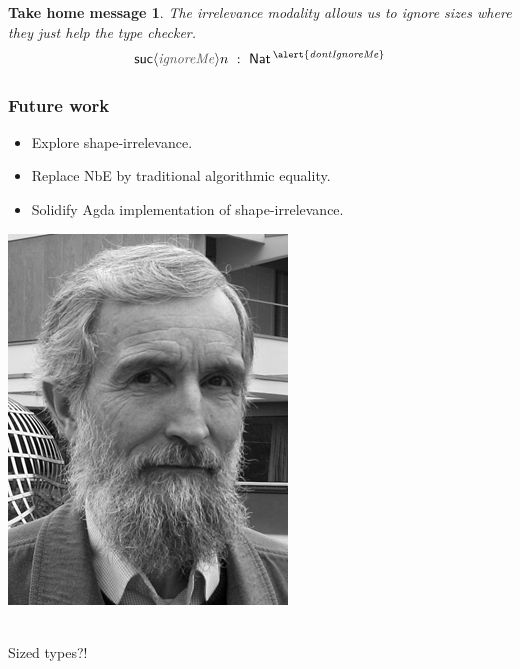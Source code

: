 \documentclass[t,fleqn]{beamer}
\newtheorem{takehomemessage}[theorem]{\textbf{Take home message}}
\newcommand{\cAnn}{\color{red!80!black}}%
\renewcommand{\emph}[1]{{\cAnn#1}}
\newcommand{\mlsays}[1]{
\begin{frame}%
  \begin{minipage}[c]{0.5\linewidth}
   \includegraphics[height=0.9\textheight]{martin-loef-bw.png}
  \end{minipage}%
  \begin{minipage}[c]{0.5\linewidth}
   \begin{center}
     \bla \\[8ex]
     \Huge #1
   \end{center}
  \end{minipage}
\end{frame}
}
\begin{document}
\begin{frame}%
\vfill
\hspace{0.15\textwidth}%
\begin{minipage}[c]{0.67\linewidth}
\begin{takehomemessage}
The irrelevance modality allows us to ignore sizes where they just help the type checker.
\[
  \suc {{\color{grey}\mathit{ignoreMe}}} n ~:~ \Nat^{\alert{\mathit{dontIgnoreMe}}}
\]
\vspace{-2ex}
\end{takehomemessage}
\end{minipage}
\vfill
\end{frame}

\begin{frame}%
  \frametitle{Future work}
  \begin{itemize}
  \item Explore \emph{shape-irrelevance}.
  \item Replace NbE by traditional algorithmic equality.
  \item Solidify Agda implementation of shape-irrelevance.
  \end{itemize}
\end{frame}


\mlsays{Sized types?!}



% 
\end{document}
